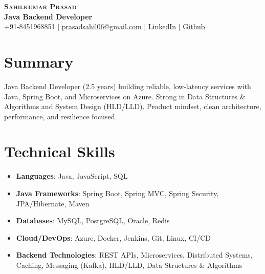 \documentclass[letterpaper,11pt]{article}
\begin{document}
\begin{center}
    \textbf{\Huge \scshape Sahilkumar Prasad} \\ \vspace{1pt}
    \textbf{\Large Java Backend Developer} \\ \vspace{2pt}
    \small +91-8451968851 $|$ \href{mailto:prasadsahil06@gmail.com}{\underline{prasadsahil06@gmail.com}} $|$
    \href{https://www.linkedin.com/in/sahilkumar-prasad-74abba272/}{\underline{LinkedIn}} $|$
    \href{https://github.com/sahill1001}{\underline{Github}}
\end{center}

\section{Summary}
Java Backend Developer (2.5 years) building reliable, low-latency services with Java, Spring Boot, and Microservices on Azure. Strong in Data Structures \& Algorithms and System Design (HLD/LLD). Product mindset, clean architecture, performance, and resilience focused.

\section{Technical Skills}
 \begin{itemize}[leftmargin=0.15in, label={}]
    \item \textbf{Languages}: Java, JavaScript, SQL
    \item \textbf{Java Frameworks}: Spring Boot, Spring MVC, Spring Security, JPA/Hibernate, Maven
    \item \textbf{Databases}: MySQL, PostgreSQL, Oracle, Redis
    \item \textbf{Cloud/DevOps}: Azure, Docker, Jenkins, Git, Linux, CI/CD
    \item \textbf{Backend Technologies}: REST APIs, Microservices, Distributed Systems, Caching, Messaging (Kafka), HLD/LLD, Data Structures \& Algorithms
 \end{itemize}

\end{document}
